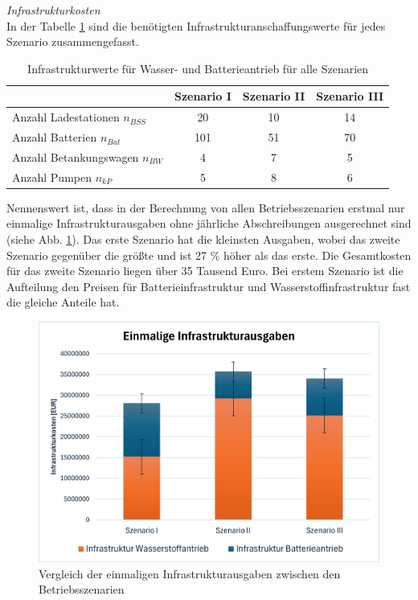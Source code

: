 \textit{Infrastrukturkosten}\\
In der Tabelle \ref{Infrastrukturwerte_res} sind die benötigten 
Infrastrukturanschaffungswerte für jedes Szenario zusammengefasst. 

\begin{table}[h]
	\begin{center}
    \caption{Infrastrukturwerte für Wasser- und Batterieantrieb für alle Szenarien}
	\label{Infrastrukturwerte_res}
	\begin{tabular}{|l|c|c|c|}
		\hline
		 & \textbf{Szenario I}& \textbf{Szenario II}& \textbf{Szenario III} \\ \hline
		Anzahl Ladestationen $n_{BSS}$ & 20 & 10& 14\\ \hline
		Anzahl Batterien $n_{Bat}$ & 101 & 51& 70 \\ \hline
		Anzahl Betankungswagen $n_{BW}$ & 4 & 7 & 5\\ \hline
		Anzahl Pumpen $n_{kP}$  & 5 & 8 & 6\\ \hline
	\end{tabular}
    \end{center}
\end{table}

Nennenswert ist, dass in der Berechnung von allen Betriebsszenarien erstmal nur einmalige Infrastrukturausgaben 
ohne jährliche Abschreibungen ausgerechnet sind (siehe Abb. \ref{res_betriebsszenarien}). 
Das erste Szenario hat die kleinsten Ausgaben, wobei das zweite Szenario gegenüber die größte und ist 27 \% höher als das erste.
Die Gesamtkosten für das zweite Szenario liegen über 35 Tausend Euro. %
Bei erstem Szenario ist die Aufteilung den Preisen für Batterieinfrastruktur und Wasserstoffinfrastruktur fast die gleiche Anteile hat.
\begin{figure}[h]
	\centering
	\includegraphics[width=0.8\linewidth]{Bilder/Infr_Szenarien.png}
	\caption[Vergleich der einmaligen Infrastrukturausgaben zwischen den Betriebsszenarien]{Vergleich der einmaligen Infrastrukturausgaben zwischen den Betriebsszenarien}
	\label{res_betriebsszenarien}
\end{figure}


